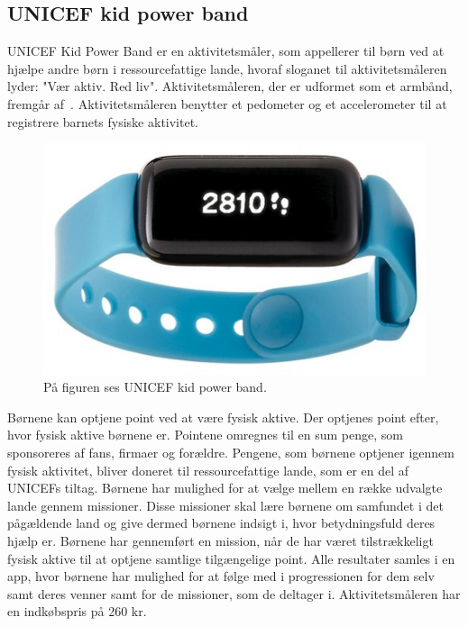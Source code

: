 \subsection{UNICEF kid power band}
UNICEF Kid Power Band er en aktivitetsmåler, som appellerer til børn ved at hjælpe andre børn i ressourcefattige lande, hvoraf sloganet til aktivitetsmåleren lyder: "Vær aktiv. Red liv".
Aktivitetsmåleren, der er udformet som et armbånd, fremgår af~. Aktivitetsmåleren benytter et pedometer og et accelerometer til at registrere barnets fysiske aktivitet. \citep{PowerAbout2015,PowerManual2015}

\begin{figure}[H]
	\centering
	\includegraphics[scale=0.55]{figures/aProblemanalyse/unicef.png}
	\caption{På figuren ses UNICEF kid power band. \cite{Unicef2016}}
	\label{fig:unicef}
\end{figure}
Børnene kan optjene point ved at være fysisk aktive. Der optjenes point efter, hvor fysisk aktive børnene er. Pointene omregnes til en sum penge, som sponsoreres af fans, firmaer og forældre. Pengene, som børnene optjener igennem fysisk aktivitet, bliver doneret til ressourcefattige lande, som er en del af UNICEFs tiltag. %
Børnene har mulighed for at vælge mellem en række udvalgte lande gennem missioner. Disse missioner skal lære børnene om samfundet i det pågældende land og give dermed børnene indsigt i, hvor betydningsfuld deres hjælp er. Børnene har gennemført en mission, når de har været tilstrækkeligt fysisk aktive til at optjene samtlige tilgængelige point. Alle resultater samles i en app, hvor børnene har mulighed for at følge med i progressionen for dem selv samt deres venner samt for de missioner, som de deltager i. Aktivitetsmåleren har en indkøbspris på 260 kr. \citep{PowerAbout2015,PowerManual2015}

